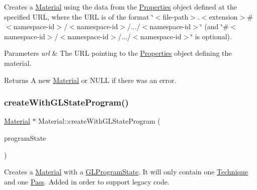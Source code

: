 Creates a \hyperlink{classMaterial}{Material} using the data from the \hyperlink{classProperties}{Properties} object defined at the specified U\+RL, where the U\+RL is of the format \char`\"{}$<$file-\/path$>$.$<$extension$>$\#$<$namespace-\/id$>$/$<$namespace-\/id$>$/.../$<$namespace-\/id$>$\char`\"{} (and \char`\"{}\#$<$namespace-\/id$>$/$<$namespace-\/id$>$/.../$<$namespace-\/id$>$\char`\"{} is optional).


\begin{DoxyParams}{Parameters}
{\em url} & The U\+RL pointing to the \hyperlink{classProperties}{Properties} object defining the material.\\
\hline
\end{DoxyParams}
\begin{DoxyReturn}{Returns}
A new \hyperlink{classMaterial}{Material} or N\+U\+LL if there was an error. 
\end{DoxyReturn}
\mbox{\label{classMaterial_a624a466fcb166e01fe57a98f209365f4}} 
\subsubsection{\texorpdfstring{create\+With\+G\+L\+State\+Program()}{createWithGLStateProgram()}\hspace{0.1cm}{\footnotesize\ttfamily [1/2]}}
{\footnotesize\ttfamily \hyperlink{classMaterial}{Material} $\ast$ Material\+::create\+With\+G\+L\+State\+Program (\begin{DoxyParamCaption}\item[{\hyperlink{classGLProgramState}{G\+L\+Program\+State} $\ast$}]{program\+State }\end{DoxyParamCaption})\hspace{0.3cm}{\ttfamily [static]}}

Creates a \hyperlink{classMaterial}{Material} with a \hyperlink{classGLProgramState}{G\+L\+Program\+State}. It will only contain one \hyperlink{classTechnique}{Technique} and one \hyperlink{classPass}{Pass}. Added in order to support legacy code. \mbox{\label{classMaterial_a1a39fdd599b90431a49866a3c27ccfae}} 
